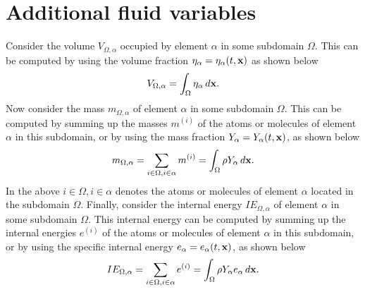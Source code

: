 \documentclass[oneside,a4paper,11pt]{report}
\begin{document}
\section{Additional fluid variables}
Consider the volume $V_{\Omega,\alpha}$ occupied by element $\alpha$ in some subdomain $\Omega$. This can be computed by using the volume fraction $\eta_\alpha = \eta_\alpha(t,\mathbf{x})$ as shown below
\begin{equation}
    V_{\Omega,\alpha} = \int_\Omega \eta_\alpha \, d\mathbf{x}.
\end{equation}
Now consider the mass $m_{\Omega,\alpha}$ of element $\alpha$ in some subdomain $\Omega$. This can be computed by summing up the masses $m^{(i)}$ of the atoms or molecules of element $\alpha$ in this subdomain, or by using the mass fraction $Y_\alpha = Y_\alpha(t,\mathbf{x})$, as shown below 
\begin{equation}
    m_{\Omega,\alpha} = \sum_{i \in \Omega, i \in \alpha} m^{(i)} = \int_\Omega \rho Y_\alpha \, d\mathbf{x}.
\end{equation}
In the above $i \in \Omega, i \in \alpha$ denotes the atoms or molecules of element $\alpha$ located in the subdomain $\Omega$. Finally, consider the internal energy $IE_{\Omega,\alpha}$ of element $\alpha$ in some subdomain $\Omega$. This internal energy can be computed by summing up the internal energies $e^{(i)}$ of the atoms or molecules of element $\alpha$ in this subdomain, or by using the specific internal energy $e_\alpha=e_\alpha(t,\mathbf{x})$, as shown below
\begin{equation}
    IE_{\Omega,\alpha} = \sum_{i \in \Omega, i \in \alpha} e^{(i)} = \int_\Omega \rho Y_\alpha e_\alpha \, d\mathbf{x}.
\end{equation}
\end{document}

